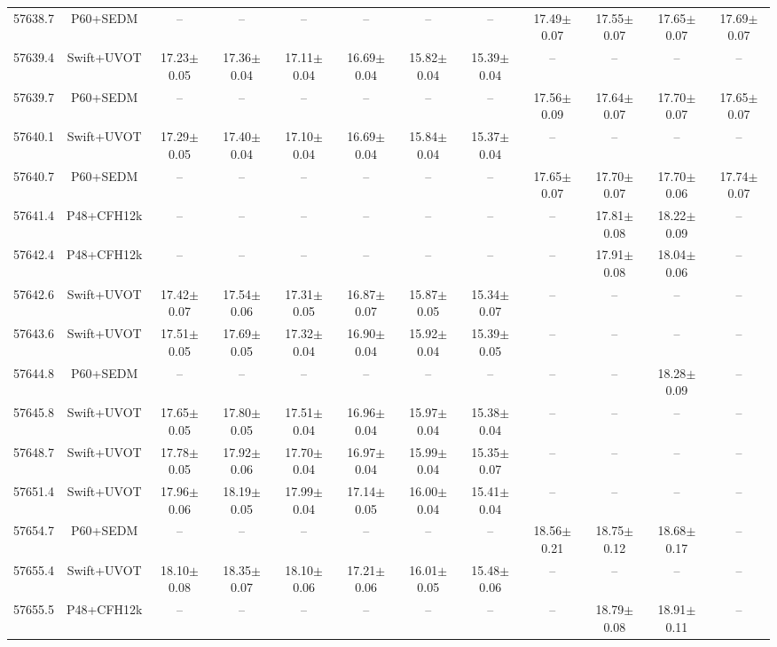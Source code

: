 \begin{tabular}{rccccccccccc}
 57638.7 & P60+SEDM& -- & -- & -- & -- & -- & -- & 17.49$\pm$0.07 & 17.55$\pm$0.07 & 17.65$\pm$0.07 & 17.69$\pm$0.07\\
 57639.4 & Swift+UVOT & 17.23$\pm$0.05 & 17.36$\pm$0.04 & 17.11$\pm$0.04 & 16.69$\pm$0.04 & 15.82$\pm$0.04 & 15.39$\pm$0.04 & -- & -- & -- & --\\
 57639.7 & P60+SEDM& -- & -- & -- & -- & -- & -- & 17.56$\pm$0.09 & 17.64$\pm$0.07 & 17.70$\pm$0.07 & 17.65$\pm$0.07\\
 57640.1 & Swift+UVOT & 17.29$\pm$0.05 & 17.40$\pm$0.04 & 17.10$\pm$0.04 & 16.69$\pm$0.04 & 15.84$\pm$0.04 & 15.37$\pm$0.04 & -- & -- & -- & --\\
 57640.7 & P60+SEDM& -- & -- & -- & -- & -- & -- & 17.65$\pm$0.07 & 17.70$\pm$0.07 & 17.70$\pm$0.06 & 17.74$\pm$0.07\\
 57641.4 & P48+CFH12k & -- & -- & -- & -- & -- & -- & -- & 17.81$\pm$0.08 & 18.22$\pm$0.09 & --\\
 57642.4 & P48+CFH12k & -- & -- & -- & -- & -- & -- & -- & 17.91$\pm$0.08 & 18.04$\pm$0.06 & --\\
 57642.6 & Swift+UVOT & 17.42$\pm$0.07 & 17.54$\pm$0.06 & 17.31$\pm$0.05 & 16.87$\pm$0.07 & 15.87$\pm$0.05 & 15.34$\pm$0.07 & -- & -- & -- & --\\
 57643.6 & Swift+UVOT & 17.51$\pm$0.05 & 17.69$\pm$0.05 & 17.32$\pm$0.04 & 16.90$\pm$0.04 & 15.92$\pm$0.04 & 15.39$\pm$0.05 & -- & -- & -- & --\\
 57644.8 & P60+SEDM& -- & -- & -- & -- & -- & -- & -- & -- & 18.28$\pm$0.09 & --\\
 57645.8 & Swift+UVOT & 17.65$\pm$0.05 & 17.80$\pm$0.05 & 17.51$\pm$0.04 & 16.96$\pm$0.04 & 15.97$\pm$0.04 & 15.38$\pm$0.04 & -- & -- & -- & --\\
 57648.7 & Swift+UVOT & 17.78$\pm$0.05 & 17.92$\pm$0.06 & 17.70$\pm$0.04 & 16.97$\pm$0.04 & 15.99$\pm$0.04 & 15.35$\pm$0.07 & -- & -- & -- & --\\
 57651.4 & Swift+UVOT & 17.96$\pm$0.06 & 18.19$\pm$0.05 & 17.99$\pm$0.04 & 17.14$\pm$0.05 & 16.00$\pm$0.04 & 15.41$\pm$0.04 & -- & -- & -- & --\\
 57654.7 & P60+SEDM& -- & -- & -- & -- & -- & -- & 18.56$\pm$0.21 & 18.75$\pm$0.12 & 18.68$\pm$0.17 & --\\
 57655.4 & Swift+UVOT & 18.10$\pm$0.08 & 18.35$\pm$0.07 & 18.10$\pm$0.06 & 17.21$\pm$0.06 & 16.01$\pm$0.05 & 15.48$\pm$0.06 & -- & -- & -- & --\\
 57655.5 & P48+CFH12k & -- & -- & -- & -- & -- & -- & -- & 18.79$\pm$0.08 & 18.91$\pm$0.11 & --\\

\end{tabular}
